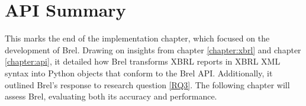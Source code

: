
\section{API Summary}

This marks the end of the implementation chapter,  
which focused on the development of Brel.  
Drawing on insights from chapter \ref{chapter:xbrl} and chapter \ref{chapter:api}, it detailed  
how Brel transforms XBRL reports in XBRL XML syntax into Python objects that conform to the Brel API.  
Additionally, it outlined Brel's response to research question \ref{RQ3}.  
The following chapter will assess Brel, evaluating both its accuracy and performance.
